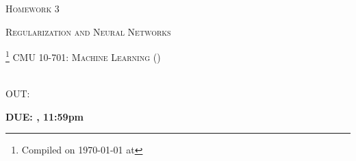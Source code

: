 \documentclass{article}
\begin{document}
\section*{}
\begin{center}
  \centerline{\textsc{\LARGE  Homework 3}}
  \vspace{0.5em}
  \centerline{\textsc{\large Regularization and Neural Networks}}
  \footnote{Compiled on \today{} at \currenttime{}}
  \vspace{1em}
  \textsc{\large CMU 10-701: Machine Learning (\currentsemester)} \\
  \vspace{0.5em}
  \currentpiazza \\
  \vspace{0.5em}
  \centerline{OUT: \hwThreeRelease}
  \vspace{0.5em}
  \centerline{\textbf{DUE: \hwThreeDue, 11:59pm}}
\end{center}
\end{document}
